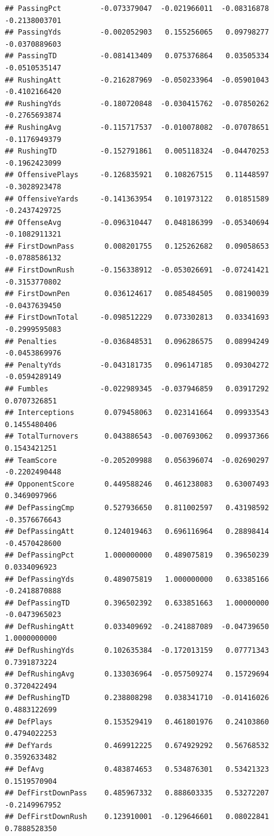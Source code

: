 \documentclass[
]{book}
\begin{document}
\begin{verbatim}
## PassingPct         -0.073379047  -0.021966011  -0.08316878 -0.2138003701
## PassingYds         -0.002052903   0.155256065   0.09798277 -0.0370889603
## PassingTD          -0.081413409   0.075376864   0.03505334 -0.0510535147
## RushingAtt         -0.216287969  -0.050233964  -0.05901043 -0.4102166420
## RushingYds         -0.180720848  -0.030415762  -0.07850262 -0.2765693874
## RushingAvg         -0.115717537  -0.010078082  -0.07078651 -0.1176949379
## RushingTD          -0.152791861   0.005118324  -0.04470253 -0.1962423099
## OffensivePlays     -0.126835921   0.108267515   0.11448597 -0.3028923478
## OffensiveYards     -0.141363954   0.101973122   0.01851589 -0.2437429725
## OffenseAvg         -0.096310447   0.048186399  -0.05340694 -0.1082911321
## FirstDownPass       0.008201755   0.125262682   0.09058653 -0.0788586132
## FirstDownRush      -0.156338912  -0.053026691  -0.07241421 -0.3153770802
## FirstDownPen        0.036124617   0.085484505   0.08190039 -0.0437639450
## FirstDownTotal     -0.098512229   0.073302813   0.03341693 -0.2999595083
## Penalties          -0.036848531   0.096286575   0.08994249 -0.0453869976
## PenaltyYds         -0.043181735   0.096147185   0.09304272 -0.0594289149
## Fumbles            -0.022989345  -0.037946859   0.03917292  0.0707326851
## Interceptions       0.079458063   0.023141664   0.09933543  0.1455480406
## TotalTurnovers      0.043886543  -0.007693062   0.09937366  0.1543421251
## TeamScore          -0.205209988   0.056396074  -0.02690297 -0.2202490448
## OpponentScore       0.449588246   0.461238083   0.63007493  0.3469097966
## DefPassingCmp       0.527936650   0.811002597   0.43198592 -0.3576676643
## DefPassingAtt       0.124019463   0.696116964   0.28898414 -0.4570428600
## DefPassingPct       1.000000000   0.489075819   0.39650239  0.0334096923
## DefPassingYds       0.489075819   1.000000000   0.63385166 -0.2418870888
## DefPassingTD        0.396502392   0.633851663   1.00000000 -0.0473965023
## DefRushingAtt       0.033409692  -0.241887089  -0.04739650  1.0000000000
## DefRushingYds       0.102635384  -0.172013159   0.07771343  0.7391873224
## DefRushingAvg       0.133036964  -0.057509274   0.15729694  0.3720422494
## DefRushingTD        0.238808298   0.038341710  -0.01416026  0.4883122699
## DefPlays            0.153529419   0.461801976   0.24103860  0.4794022253
## DefYards            0.469912225   0.674929292   0.56768532  0.3592633482
## DefAvg              0.483874653   0.534876301   0.53421323  0.1519570904
## DefFirstDownPass    0.485967332   0.888603335   0.53272207 -0.2149967952
## DefFirstDownRush    0.123910001  -0.129646601   0.08022841  0.7888528350

\end{verbatim}
\end{document}
